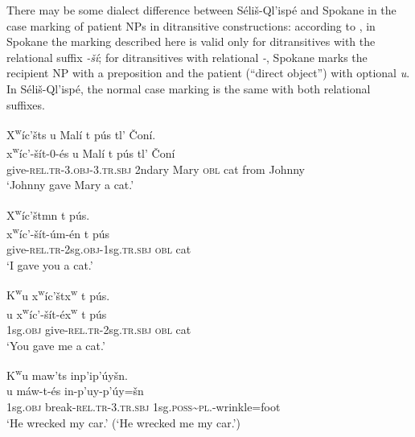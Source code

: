\documentclass[output=paper,colorlinks,citecolor=brown]{langscibook}
\begin{document}
  There may be some dialect difference between S\'eli\v{s}-Ql'isp\'e
  and Spokane in the case marking of patient NPs in ditransitive
  constructions: according to \citet[24]{Carlson:1980}, in Spokane the
  marking described here is valid only for ditransitives with the
  relational suffix \emph{-\v{s}\'i}; for ditransitives with
  relational \emph{-{\textltilde}}, Spokane marks the recipient NP
  with a preposition and the patient (``direct object'') with
  optional \emph{{\textltilde}u}.  In S\'eli\v{s}-Ql'isp\'e, the
  normal case marking is the same with both relational suffixes.


\ea 
\label{ex-thomason-7}
X\textsuperscript w\'ic'\v{s}ts {\textltilde}u Mal\'i t p\'us tl' \v{C}on\'i. \\
\gll x\textsuperscript w\'ic'-\v{s}\'it-0-\'es {\textltilde}u Mal\'i t p\'us tl' \v{C}on\'i\\
     give-\textsc{rel.tr}-3.\textsc{obj}-3.\textsc{tr.sbj} 2ndary Mary \textsc{  obl} cat from Johnny\\
\glt `Johnny gave Mary a cat.' \\
\z

\ea X\textsuperscript w\'ic'\v{s}tmn t p\'us.  \\
\label{ex-thomason-8}
\gll x\textsuperscript w\'ic'-\v{s}\'it-\'um-\'en t p\'us\\
give-\textsc{rel.tr}-2sg.\textsc{obj}-1sg.\textsc{tr.sbj} \textsc{obl} cat\\
\glt `I gave you a
cat.'
\z

\ea 
\label{ex-thomason-9}
{K\textsuperscript w}u x\textsuperscript w\'ic'\v{s}tx\textsuperscript w t  p\'us. \\
 u x\textsuperscript
w\'ic'-\v{s}\'it-\'ex\textsuperscript w t p\'us\\
1sg.\textsc{obj} give-\textsc{rel.tr}-2sg.\textsc{tr.sbj} \textsc{obl} cat \\
 \glt  `You gave me a cat.'\\
 \z

\ea 
\label{ex-thomason-10}
{K\textsuperscript w}u maw'{\textltilde}ts inp'ip'\'uy\v{s}n. \\
u m\'aw-{\textltilde}t-\'es in-p'uy-p'\'uy=\v{s}n\\
     1sg.\textsc{obj} break-\textsc{rel.tr}-3.\textsc{tr.sbj} 1sg.\textsc{poss}\textasciitilde{}\textsc{pl}.-wrinkle=foot \\
\glt `He wrecked my car.' (`He wrecked me my car.')
\z
\end{document}
